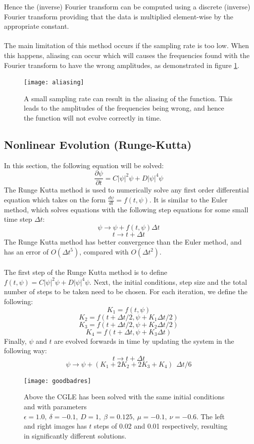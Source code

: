 \documentclass[a4paper,12pt]{report}
\begin{document}
Hence the (inverse) Fourier transform can be computed using a discrete (inverse) Fourier transform providing that the data is multiplied element-wise by the appropriate constant. 
\\
\\
The main limitation of this method occurs if the sampling rate is too low. When this happens, aliasing can occur which will causes the frequencies found with the Fourier transform to have the wrong amplitudes, as demonstrated in figure \ref{aliasing}.
\begin{figure}[h]
\centering
\texttt{[image: aliasing]}
\caption{A small sampling rate can result in the aliasing of the function. This leads to the amplitudes of the frequencies being wrong, and hence the function will not evolve correctly in time.}
\label{aliasing} 
\end{figure}





\subsection{Nonlinear Evolution (Runge-Kutta) \cite{boyce}}
In this section, the following equation will be solved:
$$\frac{\partial\psi}{\partial t}=C|\psi|^2\psi + D|\psi|^4\psi$$
The Runge Kutta method is used to numerically solve any first order differential equation which takes on the form $\frac{d\psi}{dt}=f(t,\psi)$. It is similar to the Euler method, which solves equations with the following step equations for some small time step $\Delta t$:
$$\psi\rightarrow \psi + f(t,\psi)\Delta t $$
$$t\rightarrow t+\Delta t$$
The Runge Kutta method has better convergence than the Euler method, and has an error of $O(\Delta t^5)$, compared with $O(\Delta t^2)$. 
\\\\
The first step of the Runge Kutta method is to define $f(t,\psi)=C|\psi|^2 \psi  +D|\psi|^4 \psi$. Next, the initial conditions, step size and the total number of steps to be taken need to be chosen.
For each iteration, we define the following:
$$K_1 =f(t,\psi)$$
$$K_2 =f(t+\Delta t/2,\psi+K_1 \Delta t/2)$$
$$K_3 =f(t+\Delta t/2,\psi+K_2 \Delta t/2)$$
$$K_4 =f(t+\Delta t,\psi+K_3\Delta t)$$
Finally, $\psi$ and $t$ are evolved forwards in time by updating the system in the following way:
$$t\rightarrow t+\Delta t$$
$$\psi\rightarrow \psi+(K_1+2K_2+2K_3+K_4) \ \ \Delta t/6$$


\begin{figure}[h]
\hspace*{-1.cm}
\texttt{[image: goodbadres]}
\caption{Above the CGLE has been solved with the same initial conditions and with parameters $\epsilon=1.0,\ \delta=-0.1,\ D=1, \ \beta=0.125, \ \mu=-0.1,\ \nu=-0.6$\cite{2001}. The left and right images has $t$ steps of 0.02 and 0.01 respectively, resulting in significantly different solutions.}
\label{goodbadres} 
\end{figure}
\end{document}
